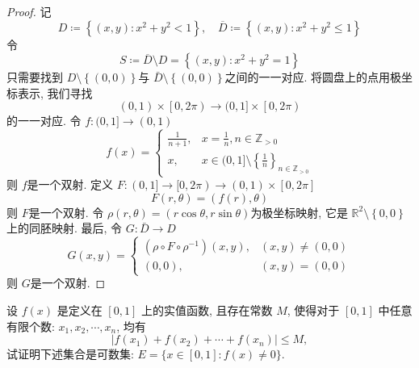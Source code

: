 \documentclass[../main.tex]{subfiles}
\begin{document}
\begin{proof}
    记 \[
    D\coloneqq \left\{ \left( x,y \right):x^{2}+ y^{2}< 1  \right\},\quad  \overline{D}\coloneqq \left\{ \left( x,y \right):x^{2}+ y^{2}\le 1  \right\}
    \]令 \[
    S\coloneqq   \overline{D}\setminus D= \left\{ \left( x,y \right):x^{2}+ y^{2}= 1  \right\}
    \] 只需要找到 \(  D\setminus \left\{ \left( 0,0 \right)  \right\}  \)与 \(  \bar{D}\setminus \left\{ \left( 0,0 \right)  \right\}  \)之间的一一对应.  将圆盘上的点用极坐标表示, 我们寻找 \[
    (0,1)\times \left[ 0,2 \pi \right)\to  (0,1]\times \left[ 0,2 \pi \right)  
    \]的一一对应. 令 \(  f:(0,1]\to (0,1)  \) \[
    f\left( x \right)= \begin{cases} \frac{1 }{n+ 1 },&x= \frac{1 }{n }, n\in \mathbb{Z} _{> 0}  \\ 
     x, & x \in (0,1]\setminus \left\{ \frac{1 }{n }  \right\}_{n\in \mathbb{Z} _{> 0}} \end{cases}  
    \] 则 \(  f  \)是一个双射. 定义 \(  F:(0,1]\to [0,2 \pi)\to (0,1)\times [0,2 \pi]  \) \[
    F\left( r, \theta  \right)= \left( f\left( r \right), \theta   \right)  
    \]则 \(  F  \)是一个双射.   令 \(  \rho \left( r, \theta  \right)= \left( r\cos  \theta , r\sin  \theta  \right)    \)为极坐标映射, 它是 \(  \mathbb{R} ^{2}\setminus \left\{ 0,0 \right\}  \)上的同胚映射. 最后, 令 \(  G:\bar{D}\to D \) \[
    G\left( x,y \right)= \begin{cases}\left( \rho \circ  F\circ  \rho ^{-1}   \right)\left( x,y \right),& \left( x,y \right)\neq \left( 0,0 \right)\\ 
     \left( 0,0 \right),& \left( x,y \right)= \left( 0,0 \right)        \end{cases}  
    \] 则 \(  G  \)是一个双射. 
\end{proof}
\begin{exercise}{}{}
    设 $f(x)$ 是定义在 $[0,1]$ 上的实值函数, 且存在常数 $M$, 使得对于 $[0,1]$ 中任意有限个数: $x_1, x_2, \cdots, x_n$, 均有
\[ |f(x_1) + f(x_2) + \cdots + f(x_n)| \le M, \]
试证明下述集合是可数集: $E = \{x \in [0,1]: f(x) \ne 0\}$.
\end{exercise}
\end{document}
